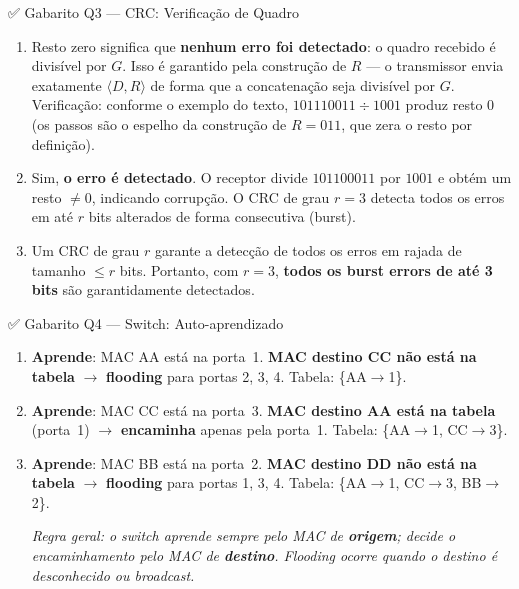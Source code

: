 \documentclass[11pt,a4paper]{article}
\begin{document}
\begin{gabaritocaixa}{✅ Gabarito Q3 --- CRC: Verificação de Quadro}
\begin{enumerate}[label=(\alph*)]
    \item Resto zero significa que \textbf{nenhum erro foi detectado}: o quadro recebido é divisível por $G$. Isso é garantido pela construção de $R$ --- o transmissor envia exatamente $\langle D, R \rangle$ de forma que a concatenação seja divisível por $G$. Verificação: conforme o exemplo do texto, $101110011 \div 1001$ produz resto 0 (os passos são o espelho da construção de $R=011$, que zera o resto por definição).
    \item Sim, \textbf{o erro é detectado}. O receptor divide $101100011$ por $1001$ e obtém um resto $\neq 0$, indicando corrupção. O CRC de grau $r=3$ detecta todos os erros em até $r$ bits alterados de forma consecutiva (burst).
    \item Um CRC de grau $r$ garante a detecção de todos os erros em rajada de tamanho $\leq r$ bits. Portanto, com $r = 3$, \textbf{todos os burst errors de até 3 bits} são garantidamente detectados.
\end{enumerate}
\end{gabaritocaixa}

\begin{gabaritocaixa}{✅ Gabarito Q4 --- Switch: Auto-aprendizado}
\begin{enumerate}[label=(\alph*)]
    \item \textbf{Aprende}: MAC AA está na porta~1. \textbf{MAC destino CC não está na tabela} $\to$ \textbf{flooding} para portas 2, 3, 4. Tabela: \{AA$\to$1\}.
    \item \textbf{Aprende}: MAC CC está na porta~3. \textbf{MAC destino AA está na tabela} (porta~1) $\to$ \textbf{encaminha} apenas pela porta~1. Tabela: \{AA$\to$1, CC$\to$3\}.
    \item \textbf{Aprende}: MAC BB está na porta~2. \textbf{MAC destino DD não está na tabela} $\to$ \textbf{flooding} para portas 1, 3, 4. Tabela: \{AA$\to$1, CC$\to$3, BB$\to$2\}.

    \textit{Regra geral: o switch aprende sempre pelo MAC de \textbf{origem}; decide o encaminhamento pelo MAC de \textbf{destino}. Flooding ocorre quando o destino é desconhecido ou broadcast.}
\end{enumerate}
\end{gabaritocaixa}
\end{document}
